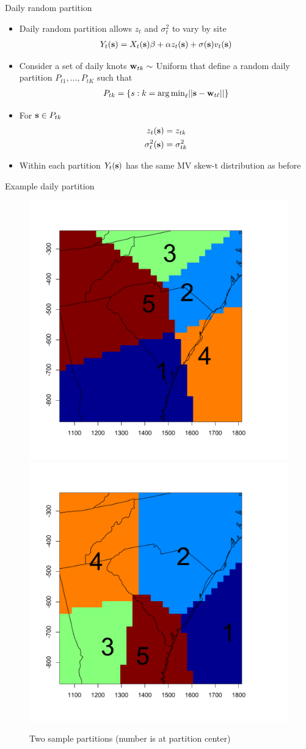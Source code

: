 \documentclass{beamer}
\begin{document}
\begin{frame}{Daily random partition}
  \begin{itemize} \setlength{\itemsep}{0.5em}
    \item Daily random partition allows $z_t$ and $\sigma^2_t$ to vary by site
    \begin{align*}
      Y_t(\mbox{\bf s}) = X_t(\mbox{\bf s}) \beta + \alpha z_t(\mbox{\bf s}) + \sigma(\mbox{\bf s}) v_t(\mbox{\bf s})
    \end{align*}
    \item Consider a set of daily knots $\mbox{\bf w}_{tk} \sim$ Uniform that define a random daily partition
    $P_{t1}, \ldots, P_{tK}$ such that
    \begin{align*}
      P_{tk} = \{s : k = {\mathop{\rm arg\, min}}_\ell|| \mbox{\bf s} - \mbox{\bf w}_{t\ell}|| \}
    \end{align*}
    \item For $\mbox{\bf s} \in P_{tk}$
    \begin{align*}
      z_t(\mbox{\bf s}) &= z_{tk}\\
      \sigma^2_t(\mbox{\bf s}) &= \sigma^2_{tk}
    \end{align*}
    \item Within each partition $Y_t(\mbox{\bf s})$ has the same MV skew-t distribution as before
  \end{itemize}
\end{frame}

\begin{frame}{Example daily partition}
    \centering
    \begin{figure}
    \includegraphics[width=0.54\linewidth]{./plots/example-partition-1.pdf}
    \includegraphics[width=0.54\linewidth]{./plots/example-partition-2.pdf}
    \caption{Two sample partitions (number is at partition center)}
    \end{figure}
\end{frame}
\end{document}
